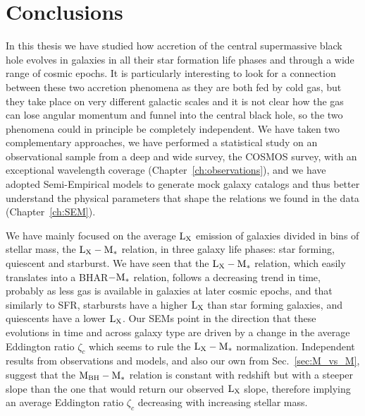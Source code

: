 \chapter{Conclusions}


In this thesis we have studied how accretion of the central supermassive black hole evolves in galaxies in all their star formation life phases and through a wide range of cosmic epochs. It is particularly interesting to look for a connection between these two accretion phenomena as they are both fed by cold gas, but they take place on very different galactic scales and it is not clear how the gas can lose angular momentum and funnel into the central black hole, so the two phenomena could in principle be completely independent. We have taken two complementary approaches, we have performed a statistical study on an observational sample from a deep and wide survey, the COSMOS survey, with an exceptional wavelength coverage (Chapter~\ref{ch:observations}), and we have adopted Semi-Empirical models to generate mock galaxy catalogs and thus better understand the physical parameters that shape the relations we found in the data (Chapter~\ref{ch:SEM}).

We have mainly focused on the average ${\rm L}_{\rm X}$ emission of galaxies divided in bins of stellar mass, the ${\rm L}_{\rm X}-{\rm M}_*$ relation, in three galaxy life phases: star forming, quiescent and starburst. We have seen that the ${\rm L}_{\rm X}-{\rm M}_*$ relation, which easily translates into a BHAR$-{\rm M}_*$ relation, follows a decreasing trend in time, probably as less gas is available in galaxies at later cosmic epochs, and that similarly to SFR, starbursts have a higher ${\rm L}_{\rm X}$ than star forming galaxies, and quiescents have a lower ${\rm L}_{\rm X}$. Our SEMs point in the direction that these evolutions in time and across galaxy type are driven by a change in the average Eddington ratio $\zeta_c$ which seems to rule the ${\rm L}_{\rm X}-{\rm M}_*$ normalization. Independent results from observations and models, and also our own from Sec.~\ref{sec:M_vs_M}, suggest that the ${\rm M}_{\rm BH}-{\rm M}_*$ relation is constant with redshift but with a steeper slope than the one that would return our observed ${\rm L}_{\rm X}$ slope, therefore implying an average Eddington ratio $\zeta_c$ decreasing with increasing stellar mass.

